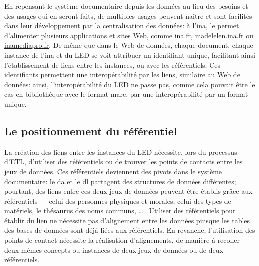En repensant le système documentaire depuis les données au lieu des besoins et des usages qui en seront faits, de multiples usages peuvent naître et sont facilités dans leur développement par la centralisation des données: à l'\ac{ina}, le \ldd permet d'alimenter plusieurs applications et sites Web, comme \href{https://www.ina.fr//}{ina.fr}, \href{https://madelen.ina.fr/}{madelelen.ina.fr} ou \href{https://www.inamediapro.com}{inamediapro.fr}. De même que dans le Web de données, chaque document, chaque instance de l'\ac{ina} et du LED se voit attribuer un identifiant unique, facilitant ainsi l'établissement de liens entre les instances, ou avec les référentiels. Ces identifiants permettent une interopérabilité par les liens, similaire au Web de données: ainsi, l'interopérabilité du LED ne passe pas, comme cela pouvait être le cas en bibliothèque avec le format \ac{marc}, par une interopérabilité par un format unique.

\subsection{\label{III-B-1-c}Le positionnement du référentiel}

La création des liens entre les instances du LED nécessite, lors du processus d'ETL, d'utiliser des référentiels ou de trouver les points de contacts entre les jeux de données. Ces référentiels deviennent des pivots dans le système documentaire: le \ac{da} et le \ac{dl} partagent des structures de données différentes; pourtant, des liens entre ces deux jeux de données peuvent être établis grâce aux référentiels --- celui des personnes physiques et morales, celui des types de matériels, le thésaurus des noms communs, \dots~ Utiliser des référentiels pour établir du lien ne nécessite pas d'alignement entre les données puisque les tables des bases de données sont déjà liées aux référentiels. En revanche, l'utilisation des points de contact nécessite la réalisation d'alignements, de manière à recoller deux mêmes concepts ou instances de deux jeux de données ou de deux référentiels.\\

